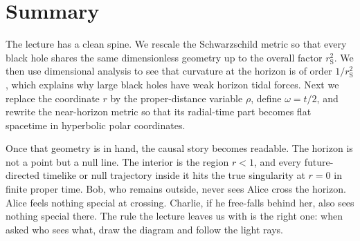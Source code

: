 \section{Summary}

The lecture has a clean spine. We rescale the Schwarzschild metric so that every black hole shares the same dimensionless geometry up to the overall factor \(r_{\mathrm S}^2\). We then use dimensional analysis to see that curvature at the horizon is of order \(1/r_{\mathrm S}^2\), which explains why large black holes have weak horizon tidal forces. Next we replace the coordinate \(r\) by the proper-distance variable \(\rho\), define \(\omega=t/2\), and rewrite the near-horizon metric so that its radial-time part becomes flat spacetime in hyperbolic polar coordinates.

Once that geometry is in hand, the causal story becomes readable. The horizon is not a point but a null line. The interior is the region \(r<1\), and every future-directed timelike or null trajectory inside it hits the true singularity at \(r=0\) in finite proper time. Bob, who remains outside, never sees Alice cross the horizon. Alice feels nothing special at crossing. Charlie, if he free-falls behind her, also sees nothing special there. The rule the lecture leaves us with is the right one: when asked who sees what, draw the diagram and follow the light rays.